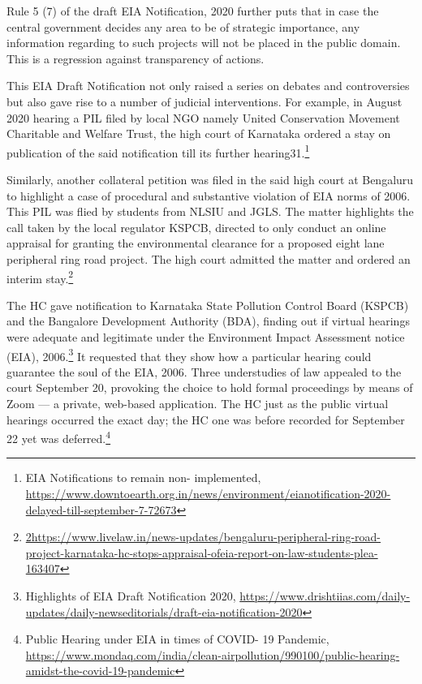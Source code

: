 \begin{multicols}{2}
\vspace{-.05cm}

\noi
Rule 5 (7) of the draft EIA Notification, 2020 further puts that in case the central government
decides any area to be of strategic importance, any information regarding to such projects
will not be placed in the public domain. This is a regression against transparency of actions.


\vspace{-.1cm}

\noi
This EIA Draft Notification not only raised a series on debates and controversies but also
gave rise to a number of judicial interventions. For example, in August 2020 hearing a PIL
filed by local NGO namely United Conservation Movement Charitable and Welfare Trust,
the high court of Karnataka ordered a stay on publication of the said notification till its
further hearing31.\footnote{EIA Notifications to remain non- implemented, \url{https://www.downtoearth.org.in/news/environment/eianotification-2020-delayed-till-september-7-72673}}

\vspace{-.1cm}

\noi
Similarly, another collateral petition was filed in the said high court at Bengaluru to highlight
a case of procedural and substantive violation of EIA norms of 2006. This PIL was flied by
students from NLSIU and JGLS. The matter highlights the call taken by the local regulator
KSPCB, directed to only conduct an online appraisal for granting the environmental
clearance for a proposed eight lane peripheral ring road project. The high court admitted the
matter and ordered an interim stay.\footnote{\url{2https://www.livelaw.in/news-updates/bengaluru-peripheral-ring-road-project-karnataka-hc-stops-appraisal-ofeia-report-on-law-students-plea-163407}}

\vspace{-.1cm}

\noi
The HC gave notification to Karnataka State Pollution Control Board (KSPCB) and the
Bangalore Development Authority (BDA), finding out if virtual hearings were adequate and
legitimate under the Environment Impact Assessment notice (EIA), 2006.\footnote{Highlights of EIA Draft Notification 2020, \url{https://www.drishtiias.com/daily-updates/daily-newseditorials/draft-eia-notification-2020}} It requested that
they show how a particular hearing could guarantee the soul of the EIA, 2006. Three
understudies of law appealed to the court September 20, provoking the choice to hold formal
proceedings by means of Zoom — a private, web-based application. The HC just as the
public virtual hearings occurred the exact day; the HC one was before recorded for
September 22 yet was deferred.\footnote{Public Hearing under EIA in times of COVID- 19 Pandemic, \url{https://www.mondaq.com/india/clean-airpollution/990100/public-hearing-amidst-the-covid-19-pandemic}}


\end{multicols}

